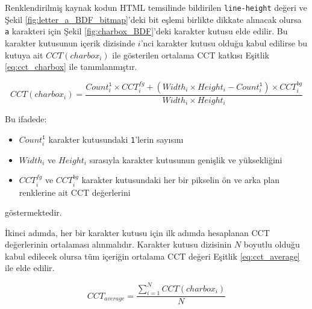 \documentclass{article}
\begin{document}
Renklendirilmiş kaynak kodun HTML temsilinde bildirilen \texttt{line-height} değeri ve Şekil
\ref{fig:letter_a_BDF_bitmap}'deki bit eşlemi birlikte dikkate alınacak olursa \texttt{a} karakteri için Şekil
\ref{fig:charbox_BDF}'deki karakter kutusu elde edilir.  Bu karakter kutusunun içerik dizisinde $i$'nci karakter kutusu
olduğu kabul edilirse bu kutuya ait $CCT(charbox_{i})$ ile gösterilen ortalama CCT katkısı Eşitlik \ref{eq:cct_charbox}
ile tanımlanmıştır.

\begin{equation}
	CCT(charbox_{i}) = \frac{
		Count_{i}^{\texttt{1}} \times CCT_{i}^{fg} +
		(Width_{i} \times Height_{i} - Count_{i}^{\texttt{1}}) \times CCT_{i}^{bg}
	}{
		Width_{i} \times Height_{i}
	}
	\label{eq:cct_charbox}
\end{equation}

Bu ifadede:

\begin{itemize}
	\item $Count_{i}^{\texttt{1}}$ karakter kutusundaki \texttt{1}'lerin sayısını
	\item $Width_{i}$ ve $Height_{i}$ sırasıyla karakter kutusunun genişlik ve yüksekliğini
	\item $CCT_{i}^{fg}$ ve $CCT_{i}^{bg}$ karakter kutusundaki her bir pikselin ön ve arka plan renklerine ait CCT değerlerini
\end{itemize}

göstermektedir.

İkinci adımda, her bir karakter kutusu için ilk adımda hesaplanan CCT değerlerinin ortalaması alınmalıdır. Karakter
kutusu dizisinin $N$ boyutlu olduğu kabul edilecek olursa tüm içeriğin ortalama CCT değeri Eşitlik
\ref{eq:cct_average} ile elde edilir.

\begin{equation}
  CCT_{average} = \frac{\sum_{i=1}^{N} CCT(charbox_{i})}{N}
	\label{eq:cct_average}
\end{equation}

\def\pixelmap_a{{%
  {0,0,0,0,0,0,0,0,0,0,0},
  {0,0,0,0,0,0,0,0,0,0,0},
  {0,0,0,0,0,0,0,0,0,0,0},
  {0,0,0,0,0,0,0,0,0,0,0},
  {0,0,0,0,0,0,0,0,0,0,0},
  {0,0,0,0,0,0,0,0,0,0,0},
  {0,0,0,0,0,0,0,0,0,0,0},
  {0,1,1,1,1,1,0,0,0,0,0},
  {0,1,0,0,0,1,0,0,0,0,0},
  {0,1,0,0,0,1,0,0,0,0,0},
  {0,0,1,1,1,1,0,0,0,0,0},
  {0,0,0,0,0,1,0,0,0,0,0},
  {0,1,0,0,0,1,0,0,0,0,0},
  {0,0,1,1,1,0,0,0,0,0,0},
  {0,0,0,0,0,0,0,0,0,0,0},
  {0,0,0,0,0,0,0,0,0,0,0},
  {0,0,0,0,0,0,0,0,0,0,0},
  {0,0,0,0,0,0,0,0,0,0,0},
  {0,0,0,0,0,0,0,0,0,0,0},
  {0,0,0,0,0,0,0,0,0,0,0},
  {0,0,0,0,0,0,0,0,0,0,0},
  {0,0,0,0,0,0,0,0,0,0,0},
}}
\end{document}
